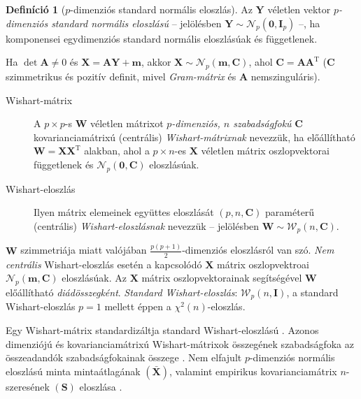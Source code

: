 \documentclass[DIV=15,appendixprefix]{scrreprt}
\theoremstyle{definition}
\newtheorem*{defin}{Definíció}
\theoremstyle{remark}
\newcommand{\normald}{\mathcal{N}}
\newcommand{\wishartd}{\mathcal{W}}
\DeclareMathOperator{\T}{T}
\begin{document}
\begin{defin}[$ p $-dimenziós standard normális eloszlás] Az $ \mathbf{ Y } $ véletlen vektor
	\emph{$ p $-dimenziós standard normális eloszlású} -- jelölésben $ \mathbf{ Y } \sim
	\normald_{ p } \left( \mathbf{ 0 },{} \mathbf{ I }_{ p } \right) $ --, ha komponensei
	egydimenziós standard normális eloszlásúak és függetlenek.
\end{defin}
Ha $ \det \mathbf{ A } \neq 0 $ és $ \mathbf{ X } = \mathbf{ A } \mathbf{ Y } + \mathbf{ m } $,
akkor $ \mathbf{ X } \sim \normald_{ p } \left( \mathbf{ m },{} \mathbf{ C } \right) $, ahol
$ \mathbf{ C } = \mathbf{ A } \mathbf{ A }^{ \T } $ ($ \mathbf{ C } $ szimmetrikus és pozitív
definit, mivel \emph{Gram-mátrix} és $ \mathbf{ A } $ nemszinguláris).
%
\leavevmode
\begin{description}
	\item[Wishart-mátrix] A $ p \times  p $-s $ \mathbf{ W } $ véletlen mátrixot
		\emph{$ p $-dimenziós, $ n $ szabadságfokú} $ \mathbf{ C } $ kovarianciamátrixú (centrális)
		\emph{Wishart-mátrixnak} nevezzük, ha előállítható $ \mathbf{ W } = \mathbf{ X }
		\mathbf{ X }^{ \T } $ alakban, ahol a $ p \times n $-es $ \mathbf{ X } $ véletlen mátrix
		oszlopvektorai függetlenek és $ \normald_{ p } \left( \mathbf{ 0 },{} \mathbf{ C } \right) $
		eloszlásúak.
	\item[Wishart-eloszlás] Ilyen mátrix elemeinek együttes eloszlását $ \left( p,{} n,{}
		\mathbf{ C } \right) $ paraméterű (centrális) \emph{Wi\-shart-eloszlásnak} nevezzük --
		jelölésben $ \mathbf{ W } \sim \wishartd_{ p } \left( n,{} \mathbf{ C } \right) $.
\end{description}
$ \mathbf{ W } $ szimmetriája miatt valójában $ \frac{ p
\left( p + 1 \right) }{ 2 } $-dimenziós eloszlásról van szó. \emph{Nem centrális} Wishart-eloszlás
esetén a kapcsolódó $ \mathbf{ X } $ mátrix oszlopvektroai $ \normald_{ p } \left( \mathbf{ m },{}
\mathbf{ C } \right) $ eloszlásúak. Az $ \mathbf{ X } $ mátrix oszlopvektorainak segítségével
$ \mathbf{ W } $ előállítható \emph{diádösszegként}. \emph{Standard Wishart-eloszlás}:
$ \wishartd_{ p } \left( n,{} \mathbf{ I } \right) $, a standard Wishart-eloszlás $ p  = 1 $ mellett
éppen a $ \chi^{ 2 } \left( n \right) $-eloszlás.

Egy Wishart-mátrix standardizáltja standard Wishart-eloszlású \cite[5. fejezet, 4. szakasz, 4.1.
tétel]{BollaKramli}. Azonos dimenziójú és kovarianciamátrixú Wishart-mátrixok összegének
szabadságfoka az összeadandók szabadságfokainak összege \cite[5. fejezet, 4. szakasz, 4.2.
állítás]{BollaKramli}. Nem elfajult $ p $-dimenziós normális eloszlású minta mintaátlagának $ \left(
\bar{ \mathbf{ X } } \right) $, valamint empirikus kovarianciamátrix $ n $-szeresének $ \left(
\mathbf{ S } \right) $ eloszlása \cite[5. fejezet, 4. szakasz, 4.3. tétel]{BollaKramli}.
\end{document}
